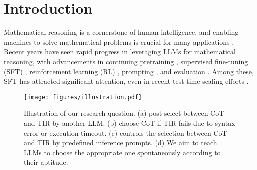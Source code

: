 \section{Introduction}\label{sec:intro}

Mathematical reasoning is a cornerstone of human intelligence, and enabling machines to solve mathematical problems is crucial for many applications \citep{llm4math2024Ahn, OlympiadBench2024He}. 
Recent years have seen rapid progress in leveraging LLMs for mathematical reasoning, with advancements in continuing pretraining \citep{minerva202lewkowycz, llemma2023azerbayev, deepseekmath2024shao}, supervised fine-tuning (SFT) \citep{metamath2023yu, dartmath2024tong, yan2024s, openmathinstruct2024toshniwal}, reinforcement learning (RL) \citep{deepseekmath2024shao, deepseekr12025deepseekai}, prompting \citep{CoT2022Wei, PHP2023Zheng, Plan-Solve2023Wang}, and evaluation \citep{CollegeMath2024Tang, ugmathbench2025xu, omnimath2024gao, ugphysics2025xu}. 
Among these, SFT has attracted significant attention, even in recent test-time scaling efforts \citep{s12025muennighoff}.

\begin{figure}[t]
    \centering
    \texttt{[image: figures/illustration.pdf]}
    \caption{Illustration of our research question. (a) \citet{automatictoolselect2023zhao} post-select between CoT and TIR by another LLM. (b) \citet{mammoth2023yue} choose CoT if TIR fails due to syntax error or execution timeout. (c) \citet{qwen252024Yang} controls the selection between CoT and TIR by predefined inference prompts. (d) We aim to teach LLMs to choose the appropriate one spontaneously according to their aptitude. }
    \label{fig:illustration}
\end{figure}


